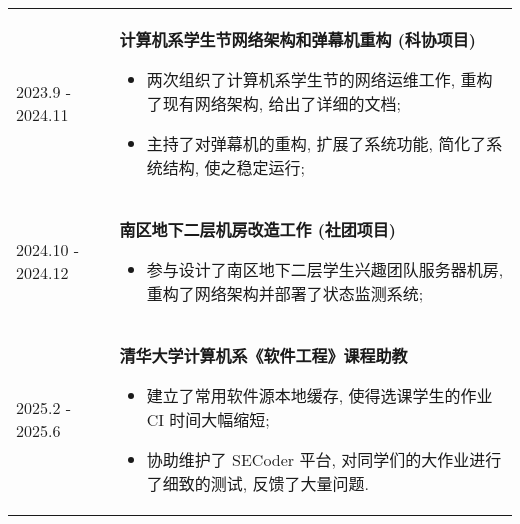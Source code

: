\documentclass[a4paper, 10pt]{article}
\begin{document}
\begin{tabular}{p{}p{}}
    2023.9 - 2024.11 & \textbf{计算机系学生节网络架构和弹幕机重构 (科协项目)}
        \fontsize{8pt}{10pt}\selectfont \begin{itemize}[left=0pt,topsep=0pt,partopsep=0pt,parsep=0pt,itemsep=0pt]
            \item 两次组织了计算机系学生节的网络运维工作, 重构了现有网络架构, 给出了详细的文档;
            \item 主持了对弹幕机的重构, 扩展了系统功能, 简化了系统结构, 使之稳定运行;
        \end{itemize} \\

    2024.10 - 2024.12 & \textbf{南区地下二层机房改造工作 (社团项目)}
        \fontsize{8pt}{10pt}\selectfont \begin{itemize}[left=0pt,topsep=0pt,partopsep=0pt,parsep=0pt,itemsep=0pt]
            \item 参与设计了南区地下二层学生兴趣团队服务器机房, 重构了网络架构并部署了状态监测系统;
        \end{itemize} \\
    
    2025.2 - 2025.6 & \textbf{清华大学计算机系《软件工程》课程助教}
        \fontsize{8pt}{10pt}\selectfont \begin{itemize}[left=0pt,topsep=0pt,partopsep=0pt,parsep=0pt,itemsep=0pt]
            \item 建立了常用软件源本地缓存, 使得选课学生的作业 CI 时间大幅缩短;
            \item 协助维护了 SECoder 平台, 对同学们的大作业进行了细致的测试, 反馈了大量问题.
        \end{itemize}
\end{tabular}
\end{document}
